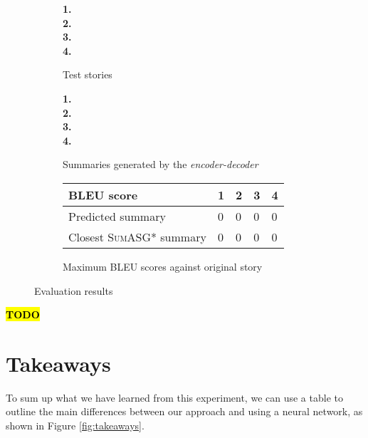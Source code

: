 \begin{figure}[H]
\begin{subfigure}{\textwidth}
\begin{displayquote}
\textbf{1.}\\
\textbf{2.}\\
\textbf{3.}\\
\textbf{4.}\\
\end{displayquote}
\caption{Test stories}
\end{subfigure}
\begin{subfigure}{\textwidth}
\vspace{\baselineskip}
\begin{displayquote}
\textbf{1.}\\
\textbf{2.}\\
\textbf{3.}\\
\textbf{4.}\\
\end{displayquote}
\caption{Summaries generated by the \textit{encoder-decoder}}
\end{subfigure}
\begin{subfigure}{\textwidth}
\vspace{\baselineskip}
\centering
\begin{tabular}{@{}lllll@{}}
\toprule
BLEU score                                        & 1 & 2 & 3 & 4 \\ \midrule
Predicted summary                                 & 0 & 0 & 0 & 0 \\
Closest \textsc{SumASG*} summary & 0 & 0 & 0 & 0 \\ \bottomrule
\end{tabular}
\caption{Maximum BLEU scores against original story}
\end{subfigure}
\caption{Evaluation results}
\label{fig:neural_network_testing}
\end{figure}

\textcolor{red}{\textbf{\hl{TODO}}}

\section{Takeaways}

To sum up what we have learned from this experiment, we can use a table to outline the main differences between our approach and using a neural network, as shown in Figure \ref{fig:takeaways}.

